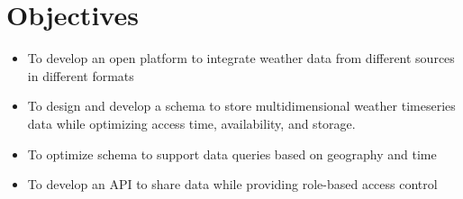 \section{Objectives}
\begin{itemize}
    \item To develop an open platform to integrate weather data from different sources in different formats
    \item To design and develop a schema to store multidimensional weather timeseries data while optimizing access time, availability, and storage.
    \item To optimize schema to support data queries based on geography and time
    \item To develop an API to share data while providing role-based access control
\end{itemize}
